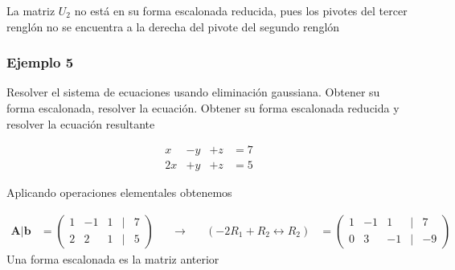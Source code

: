 \documentclass[
]{article}
\begin{document}
La matriz \(U_2\) no está en su forma escalonada reducida, pues los
pivotes del tercer renglón no se encuentra a la derecha del pivote del
segundo renglón

\hypertarget{ejemplo-5}{%
\subsubsection{Ejemplo 5}\label{ejemplo-5}}

Resolver el sistema de ecuaciones usando eliminación gaussiana. Obtener
su forma escalonada, resolver la ecuación. Obtener su forma escalonada
reducida y resolver la ecuación resultante

\begin{equation*}
  \begin{matrix}
         x   &  -y & +z & = 7  \\
         2x   &  +y & +z  & = 5
  \end{matrix}
\end{equation*}

Aplicando operaciones elementales obtenemos

\begin{equation*}
 \begin{array}{ccccc}
   \mathbf{A}|\mathbf{b} & = \begin{pmatrix}
                                  1   & -1 &   1  &|& 7   \\
                                  2   &  2 &   1  &|& 5    
                                \end{pmatrix} & \quad\rightarrow \quad
    & (-2R_1 + R_2 \leftrightarrow R_2)  
        &= \begin{pmatrix}
                                  1   & -1 &  1  &|& 7   \\
                                  0   &  3 & -1  &|& -9   
                                \end{pmatrix}
 \end{array}
\end{equation*} Una forma escalonada es la matriz anterior
\end{document}
